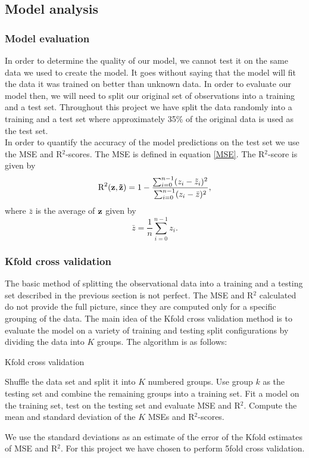 \documentclass[notitlepage, reprint, nofootinbib]{revtex4-1}
\begin{document}
\subsection{Model analysis} 
\subsubsection{Model evaluation}
In order to determine the quality of our model, we cannot test it on the same data we used to create the model. It goes without saying that the model will fit the data it was trained on better than unknown data. In order to evaluate our model then, we will need to split our original set of observations into a training and a test set. Throughout this project we have split the data randomly into a training and a test set where approximately 35\% of the original data is used as the test set.\\[2mm]
In order to quantify the accuracy of the model predictions on the test set we use the MSE and R$^2$-scores. The MSE is defined in equation \ref{MSE}. The R$^2$-score is given by 
\begin{equation}\label{R2}\text{R}^2(\vb{z},\vb{\tilde{z}})=1-\frac{\sum_{i=0}^{n-1}(z_i-\tilde{z}_i)^2}{\sum_{i=0}^{n-1}(z_i-\bar{z})^2},\end{equation}
where $\bar{z}$ is the average of $\vb{z}$ given by
\begin{equation}\bar{z}=\frac{1}{n}\sum_{i=0}^{n-1}z_i.\end{equation}

\subsubsection{Kfold cross validation}
The basic method of splitting the observational data into a training and a testing set described in the previous section is not perfect. The MSE and R$^2$ calculated do not provide the full picture, since they are computed only for a specific grouping of the data. The main idea of the Kfold cross validation method is to evaluate the model on a variety of training and testing split configurations by dividing the data into $K$ groups. The algorithm is as follows:
\begin{algorithm}[H]
	\caption{Kfold cross validation}
	\begin{algorithmic}[1]
		\State Shuffle the data set and split it into $K$ numbered groups.
			\State Use group $k$ as the testing set and combine the remaining groups into a training set. 
			\State Fit a model on the training set, test on the testing set and evaluate MSE and R$^2$. 
		\EndFor
		\State Compute the mean and standard deviation of  the $K$ MSEs and R$^2$-scores. 
	\end{algorithmic}
\end{algorithm}
We use the standard deviations as an estimate of the error of the Kfold estimates of MSE and R$^2$. For this project we have chosen to perform 5fold cross validation.
\end{document}

